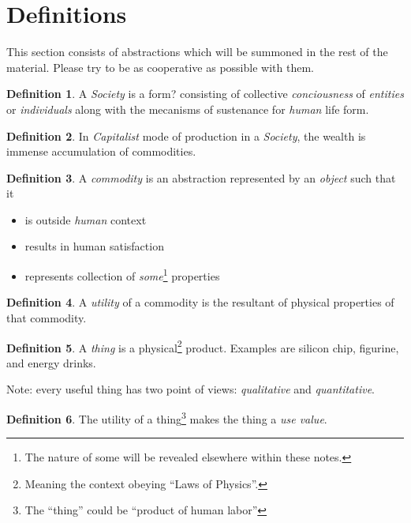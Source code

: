\documentclass[12pt]{extarticle}
\theoremstyle{definition}
\newtheorem{definition}{Definition}[section]
\begin{document}
\section{Definitions}
This section consists of abstractions which will be summoned in the rest of the material.  Please try to be as cooperative as possible with them.

\begin{definition}
  A \emph{Society} is a form? consisting of collective \emph{conciousness} of \emph{entities} or \emph{individuals} along with the mecanisms of sustenance for \emph{human} life form.  
  \end{definition}

\begin{definition}
  In \emph{Capitalist} mode of production in a \emph{Society}, the wealth is immense accumulation of commodities.
\end{definition}

\begin{definition}
  \label{def:commodity}
  A \emph{commodity} is an abstraction represented by an \emph{object} such that it
  \begin{itemize}
  \item is outside \emph{human} context
  \item results in human satisfaction
  \item represents collection of \emph{some}\footnote{The nature of some will be revealed elsewhere within these notes.} properties
  \end{itemize} 
\end{definition}

\begin{definition}
  A \emph{utility} of a commodity is the resultant of physical properties of that commodity.
\end{definition}

\begin{definition}
 \label{def:thing}
  A \emph{thing} is a physical\footnote{Meaning the context obeying ``Laws of Physics''.} product.  Examples are silicon chip, figurine, and energy drinks.
\end{definition}
Note: every useful thing has two point of views: \emph{qualitative} and \emph{quantitative}.

\begin{definition}
  \label{def:usevalue}
  The utility of a thing\footnote{The ``thing'' could be ``product of human labor''} makes the thing a \emph{use value}.
  \end{definition}
\end{document}
